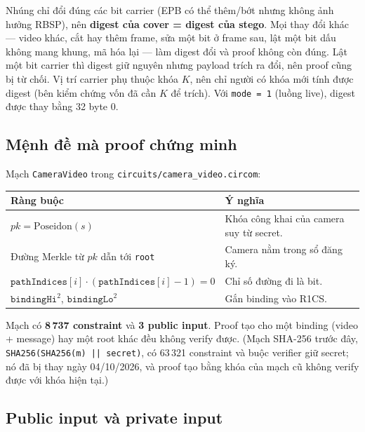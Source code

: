 \documentclass[11pt,a4paper]{article}
\begin{document}
Nhúng chỉ đổi đúng các bit carrier (EPB có thể thêm/bớt nhưng không ảnh hưởng RBSP),
nên \textbf{digest của cover = digest của stego}. Mọi thay đổi khác --- video khác, cắt
hay thêm frame, sửa một bit ở frame sau, lật một bit dấu không mang khung, mã hóa lại
--- làm digest đổi và proof không còn đúng. Lật một bit carrier thì digest giữ nguyên
nhưng payload trích ra đổi, nên proof cũng bị từ chối. Vị trí carrier phụ thuộc khóa
\(K\), nên chỉ người có khóa mới tính được digest (bên kiểm chứng vốn đã cần \(K\) để
trích). Với \texttt{mode = 1} (luồng live), digest được thay bằng 32 byte 0.

\subsection{Mệnh đề mà proof chứng minh}

Mạch \texttt{CameraVideo} trong \nolinkurl{circuits/camera_video.circom}:

\begin{center}
\small
\begin{tabular}{ll}
\toprule
Ràng buộc & Ý nghĩa \\
\midrule
\(pk = \mathrm{Poseidon}(s)\) & Khóa công khai của camera suy từ secret. \\
Đường Merkle từ \(pk\) dẫn tới \texttt{root} & Camera nằm trong sổ đăng ký. \\
\(\texttt{pathIndices}[i] \cdot (\texttt{pathIndices}[i] - 1) = 0\) & Chỉ số đường đi là bit. \\
\(\texttt{bindingHi}^2\), \(\texttt{bindingLo}^2\) & Gắn binding vào R1CS. \\
\bottomrule
\end{tabular}
\end{center}

Mạch có \textbf{8\,737 constraint} và \textbf{3 public input}. Proof tạo cho một
binding (video + message) hay một root khác đều không verify được. (Mạch SHA-256 trước
đây, \texttt{SHA256(SHA256(m) || secret)}, có 63\,321 constraint và buộc verifier giữ
secret; nó đã bị thay ngày 04/10/2026, và proof tạo bằng khóa của mạch cũ không verify
được với khóa hiện tại.)

\subsection{Public input và private input}
\end{document}
